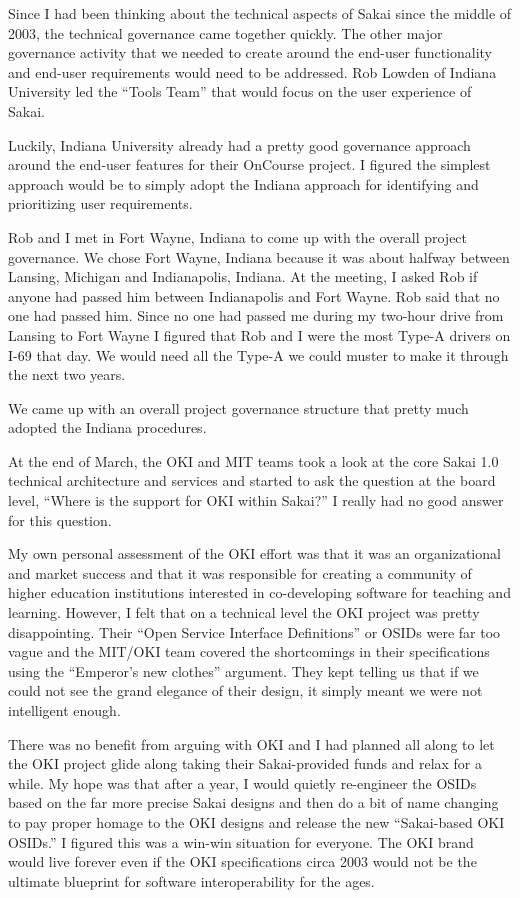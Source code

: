 \documentclass[12pt]{book}
\begin{document}
Since I had been thinking about the technical aspects of Sakai since the middle
of 2003, the technical governance came together quickly.   The other major
governance activity that we needed to create around the end-user functionality
and end-user requirements would need to be addressed.  Rob Lowden
of Indiana University led the ``Tools Team'' that would focus on the user experience
of Sakai.

Luckily, Indiana University already had a pretty good governance approach around the
end-user features for their OnCourse project.   I figured the simplest approach would
be to simply adopt the Indiana approach for identifying and prioritizing user
requirements.

Rob and I met in Fort Wayne, Indiana to come up with the overall
project governance.  We chose Fort Wayne, Indiana because
it was about halfway between Lansing, Michigan and Indianapolis, Indiana.  At
the meeting, I asked Rob if anyone had passed him between Indianapolis and Fort Wayne.
Rob said that no one had passed him.   Since no one had passed me during my two-hour drive
from Lansing to Fort Wayne I figured that Rob and I were the most Type-A drivers on I-69
that day.  We would need all the Type-A we could muster to make it through the next two
years.

We came up with an overall project governance structure that pretty much adopted
the Indiana procedures.

At the end of March, the OKI and MIT teams took a look at the core Sakai
1.0 technical architecture and services and started to ask the question at the board level,
``Where is the support for OKI within Sakai?'' I really had no good answer
for this question.

My own personal assessment of the OKI effort was that
it was an organizational and market success and that it was responsible
for creating a community of higher education institutions interested in
co-developing software for teaching and learning.   However, I felt that
on a technical level the OKI project was pretty disappointing.
Their ``Open Service Interface Definitions'' or OSIDs
were far too vague and the MIT\slash OKI team covered
the shortcomings in their specifications
using the ``Emperor's new clothes'' argument.  They kept telling
us that if we could not see the grand elegance of their design, it
simply meant we were not intelligent enough.

There was no benefit from arguing with OKI and I had planned all along to
let the OKI project glide along taking their Sakai-provided
funds and relax for a while.  My hope was that
after a year, I would quietly re-engineer the OSIDs
based on the far more precise Sakai designs and then do a bit of
name changing to pay proper homage to the OKI designs and release
the new ``Sakai-based OKI OSIDs.''  I figured this was a win-win situation
for everyone.
The OKI brand would live forever
even if the OKI specifications circa 2003 would not be the ultimate
blueprint for software interoperability for the ages.
\end{document}
